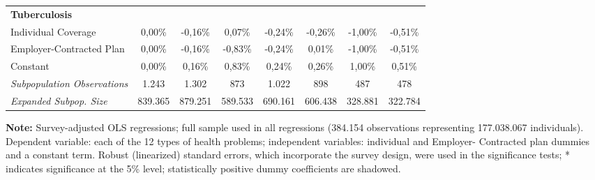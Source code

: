 \documentclass{article}
\begin{document}
\begin{table*}
{\begin{tabular}{l*{7}{c}}
\midrule
\textbf{Tuberculosis}  & & & & & & & \\

Individual Coverage      &  0,00\%         & -0,16\%         &  0,07\%         & -0,24\%         & -0,26\%         & -1,00\%         & -0,51\%         \\
Employer-Contracted Plan &  0,00\%         & -0,16\%         & -0,83\%         & -0,24\%         &  0,01\%         & -1,00\%         & -0,51\%         \\
Constant                 &  0,00\%         &  0,16\%         &  0,83\%         &  0,24\%         &  0,26\%         &  1,00\%         &  0,51\%         \\

\midrule

\textit{Subpopulation Observations} 	& 1.243 & 1.302 & 873 & 1.022 & 898 & 487 & 478         \\
\textit{Expanded Subpop. Size} 		& 839.365 & 879.251 & 589.533 & 690.161 & 606.438 & 328.881 & 322.784      \\

	\hline \hline

\end{tabular}}

\justify \small {} \textbf{Note:} Survey-adjusted OLS regressions; full sample used in all regressions (384.154 observations representing 177.038.067
individuals). Dependent variable: each of the 12 types of health problems; independent variables: individual and Employer-
Contracted plan dummies and a constant term. Robust (linearized) standard errors, which incorporate the survey design, were
used in the significance tests; * indicates significance at the 5\% level; statistically positive dummy coefficients are shadowed.

\end{table*}










\newpage
\end{document}
